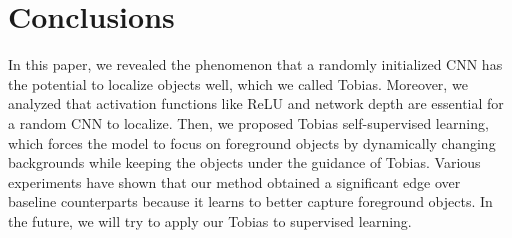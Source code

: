 \documentclass[letterpaper]{article} %
\begin{document}
\section{Conclusions}

In this paper, we revealed the phenomenon that a randomly initialized CNN has the potential to localize objects well, which we called Tobias. Moreover, we analyzed that activation functions like ReLU and network depth are essential for a random CNN to localize. Then, we proposed Tobias self-supervised learning, which forces the model to focus on foreground objects by dynamically changing backgrounds while keeping the objects under the guidance of Tobias. Various experiments have shown that our method obtained a significant edge over baseline counterparts because it learns to better capture foreground objects. In the future, we will try to apply our Tobias to supervised learning. 

%

\end{document}
